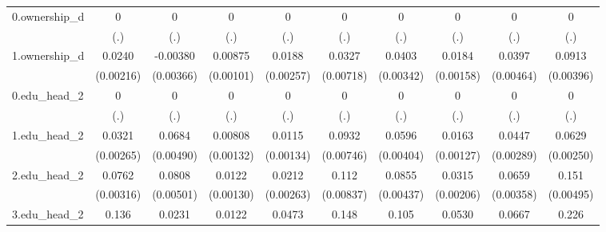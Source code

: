 \begin{table}[htbp]
{\begin{tabular}{l*{9}{c}}
0.ownership_d&           0         &           0         &           0         &           0         &           0         &           0         &           0         &           0         &           0         \\
            &         (.)         &         (.)         &         (.)         &         (.)         &         (.)         &         (.)         &         (.)         &         (.)         &         (.)         \\
1.ownership_d&      0.0240\sym{***}&    -0.00380         &     0.00875\sym{***}&      0.0188\sym{***}&      0.0327\sym{***}&      0.0403\sym{***}&      0.0184\sym{***}&      0.0397\sym{***}&      0.0913\sym{***}\\
            &   (0.00216)         &   (0.00366)         &   (0.00101)         &   (0.00257)         &   (0.00718)         &   (0.00342)         &   (0.00158)         &   (0.00464)         &   (0.00396)         \\
0.edu_head_2&           0         &           0         &           0         &           0         &           0         &           0         &           0         &           0         &           0         \\
            &         (.)         &         (.)         &         (.)         &         (.)         &         (.)         &         (.)         &         (.)         &         (.)         &         (.)         \\
1.edu_head_2&      0.0321\sym{***}&      0.0684\sym{***}&     0.00808\sym{***}&      0.0115\sym{***}&      0.0932\sym{***}&      0.0596\sym{***}&      0.0163\sym{***}&      0.0447\sym{***}&      0.0629\sym{***}\\
            &   (0.00265)         &   (0.00490)         &   (0.00132)         &   (0.00134)         &   (0.00746)         &   (0.00404)         &   (0.00127)         &   (0.00289)         &   (0.00250)         \\
2.edu_head_2&      0.0762\sym{***}&      0.0808\sym{***}&      0.0122\sym{***}&      0.0212\sym{***}&       0.112\sym{***}&      0.0855\sym{***}&      0.0315\sym{***}&      0.0659\sym{***}&       0.151\sym{***}\\
            &   (0.00316)         &   (0.00501)         &   (0.00130)         &   (0.00263)         &   (0.00837)         &   (0.00437)         &   (0.00206)         &   (0.00358)         &   (0.00495)         \\
3.edu_head_2&       0.136\sym{***}&      0.0231\sym{***}&      0.0122\sym{***}&      0.0473\sym{***}&       0.148\sym{***}&       0.105\sym{***}&      0.0530\sym{***}&      0.0667\sym{***}&       0.226\sym{***}\\

\end{tabular}}
\end{table}
